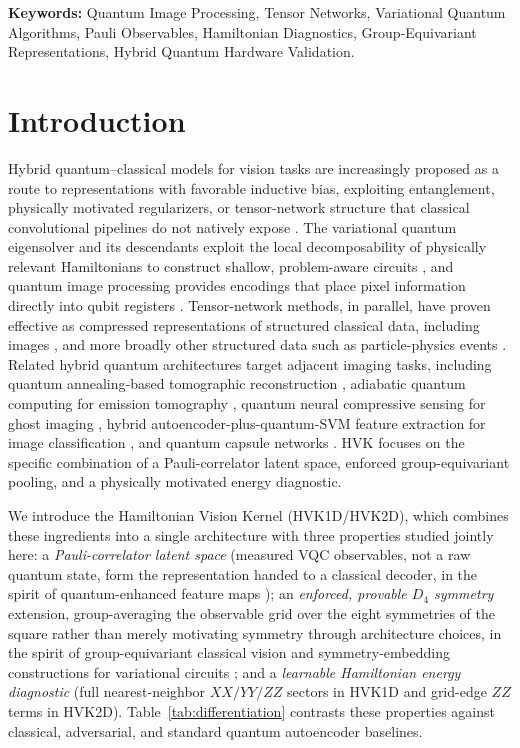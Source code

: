 \documentclass[11pt]{article}
\begin{document}
\noindent\textbf{Keywords:} Quantum Image Processing, Tensor Networks, Variational Quantum Algorithms, Pauli Observables, Hamiltonian Diagnostics, Group-Equivariant Representations, Hybrid Quantum Hardware Validation.

\bigskip

\section{Introduction}
Hybrid quantum--classical models for vision tasks are increasingly proposed as a route to representations with favorable inductive bias, exploiting entanglement, physically motivated regularizers, or tensor-network structure that classical convolutional pipelines do not natively expose \cite{Cerezo2021, Tilly2022, Preskill2018}. The variational quantum eigensolver and its descendants exploit the local decomposability of physically relevant Hamiltonians to construct shallow, problem-aware circuits \cite{Cerezo2021, Tilly2022, Bauer2020}, and quantum image processing provides encodings that place pixel information directly into qubit registers \cite{Chakraborty2018, Zhou2017, Yao2017}. Tensor-network methods, in parallel, have proven effective as compressed representations of structured classical data, including images \cite{Cirac2021, Latorre2005, Han2018, Stoudenmire2016, Fei2021, Guala2023}, and more broadly other structured data such as particle-physics events \cite{Araz2022}. Related hybrid quantum architectures target adjacent imaging tasks, including quantum annealing-based tomographic reconstruction \cite{Haga2024}, adiabatic quantum computing for emission tomography \cite{Nau2023}, quantum neural compressive sensing for ghost imaging \cite{Zhai2025}, hybrid autoencoder-plus-quantum-SVM feature extraction for image classification \cite{Slabbert2024}, and quantum capsule networks \cite{Liu2022}. HVK focuses on the specific combination of a Pauli-correlator latent space, enforced group-equivariant pooling, and a physically motivated energy diagnostic.

We introduce the Hamiltonian Vision Kernel (HVK1D/HVK2D), which combines these ingredients into a single architecture with three properties studied jointly here: a \emph{Pauli-correlator latent space} (measured VQC observables, not a raw quantum state, form the representation handed to a classical decoder, in the spirit of quantum-enhanced feature maps \cite{Havlicek2019}); an \emph{enforced, provable $D_4$ symmetry} extension, group-averaging the observable grid over the eight symmetries of the square rather than merely motivating symmetry through architecture choices, in the spirit of group-equivariant classical vision \cite{Cohen2016} and symmetry-embedding constructions for variational circuits \cite{Meyer2023}; and a \emph{learnable Hamiltonian energy diagnostic} (full nearest-neighbor $XX/YY/ZZ$ sectors in HVK1D and grid-edge $ZZ$ terms in HVK2D). Table~\ref{tab:differentiation} contrasts these properties against classical, adversarial, and standard quantum autoencoder baselines.
\end{document}
